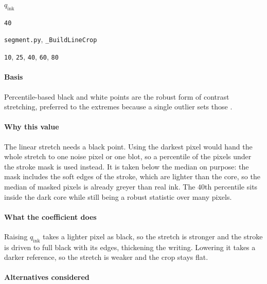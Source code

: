 \begin{description}[leftmargin=5.2em,style=sameline]

\item[Symbol] $q_{\text{ink}}$

\item[Value] \texttt{40}

\item[Source] \texttt{segment.py}, \texttt{\_BuildLineCrop}

\item[Swept] \texttt{10}, \texttt{25}, \texttt{40}, \texttt{60}, \texttt{80}

\end{description}

\paragraph{Basis}

Percentile-based black and white points are the robust form of contrast stretching, preferred to the extremes because a single outlier sets those \cite{haralick1987}.

\paragraph{Why this value}

The linear stretch needs a black point. Using the darkest pixel would hand the whole stretch to one noise pixel or one blot, so a percentile of the pixels under the stroke mask is used instead. It is taken below the median on purpose: the mask includes the soft edges of the stroke, which are lighter than the core, so the median of masked pixels is already greyer than real ink. The $40$th percentile sits inside the dark core while still being a robust statistic over many pixels.

\paragraph{What the coefficient does}

Raising $q_{\text{ink}}$ takes a lighter pixel as black, so the stretch is stronger and the stroke is driven to full black with its edges, thickening the writing. Lowering it takes a darker reference, so the stretch is weaker and the crop stays flat.

\paragraph{Alternatives considered}

